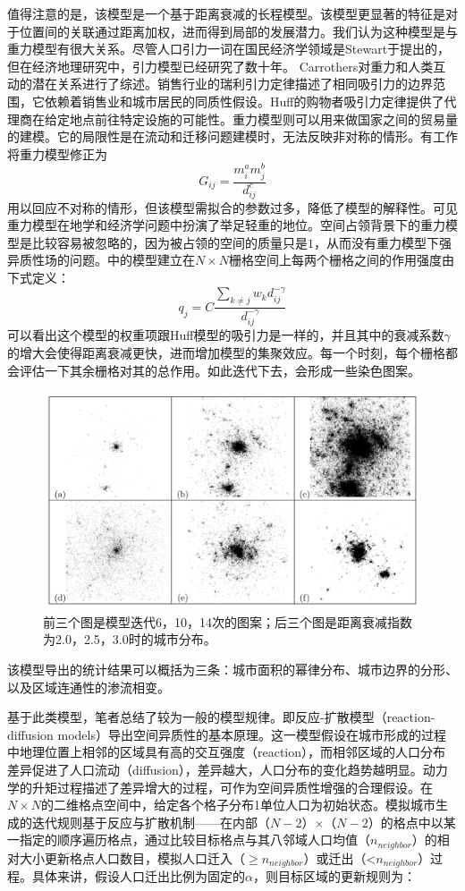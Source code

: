 值得注意的是，该模型是一个基于距离衰减的长程模型。该模型更显著的特征是对于位置间的关联通过距离加权，进而得到局部的发展潜力。我们认为这种模型是与重力模型有很大关系。尽管人口引力一词在国民经济学领域是Stewart于\cite{10.2307/2785468}提出的，但在经济地理研究中，引力模型已经研究了数十年。 Carrothers\cite{carrothers1956historical}对重力和人类互动的潜在关系进行了综述。销售行业的瑞利引力定律描述了相同吸引力的边界范围\cite{reilly1931law}，它依赖着销售业和城市居民的同质性假设。Huff的购物者吸引力定律\cite{10.2307/3144521}提供了代理商在给定地点前往特定设施的可能性。重力模型则可以用来做国家之间的贸易量的建模。它的局限性是在流动和迁移问题建模时，无法反映非对称的情形。有工作将重力模型修正为\[G_{ij} = \frac{m_i^am_j^b}{d_{ij}^c}\]用以回应不对称的情形，但该模型需拟合的参数过多，降低了模型的解释性。可见重力模型在地学和经济学问题中扮演了举足轻重的地位。空间占领背景下的重力模型是比较容易被忽略的，因为被占领的空间的质量只是$1$，从而没有重力模型下强异质性场的问题。\cite{PhysRevE.87.042114}中的模型建立在$N\times N$栅格空间上每两个栅格之间的作用强度由下式定义：\[q_j = C\frac{\sum_{k\ne j}w_k d_{ij}^{-\gamma}}{d_{ij}^{-\gamma}}\]可以看出这个模型的权重项跟Huff模型的吸引力是一样的，并且其中的衰减系数$\gamma$的增大会使得距离衰减更快，进而增加模型的集聚效应。每一个时刻，每个栅格都会评估一下其余栅格对其的总作用。如此迭代下去，会形成一些染色图案。\begin{figure}
    \centering
    \includegraphics[width=\textwidth]{pictures/distance-weighted.png}
    \caption{前三个图是模型迭代6，10，14次的图案；后三个图是距离衰减指数为2.0，2.5，3.0时的城市分布。}
\end{figure}
该模型导出的统计结果可以概括为三条：城市面积的幂律分布、城市边界的分形、以及区域连通性的渗流相变。

基于此类模型，笔者总结了较为一般的模型规律。即反应-扩散模型（reaction-diffusion models）导出空间异质性的基本原理。这一模型假设在城市形成的过程中地理位置上相邻的区域具有高的交互强度（reaction），而相邻区域的人口分布差异促进了人口流动（diffusion），差异越大，人口分布的变化趋势越明显。动力学的升矩过程描述了差异增大的过程，可作为空间异质性增强的合理假设。在$N\times N$的二维格点空间中，给定各个格子分布1单位人口为初始状态。模拟城市生成的迭代规则基于反应与扩散机制——在内部（$N-2$）$\times$（$N-2$）的格点中以某一指定的顺序遍历格点，通过比较目标格点与其八邻域人口均值（$n_{neighbor}$）的相对大小更新格点人口数目，模拟人口迁入（$\geq n_{neighbor}$）或迁出（\textless$n_{neighbor}$）过程。具体来讲，假设人口迁出比例为固定的$\alpha$，则目标区域的更新规则为：

